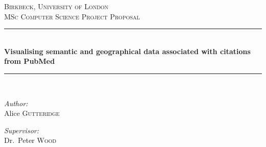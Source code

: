\documentclass[PROP_AGutteridge_CS.tex]{subfiles}
\begin{document}
\newcommand{\HRule}{\rule{\linewidth}{0.5mm}}
\begin{center}

\thispagestyle{empty}

\textsc{\LARGE Birkbeck, University of London}\\[1.5cm]

\textsc{\Large MSc Computer Science Project Proposal}\\[0.5cm]

\HRule \\[0.4cm]
{ \huge \bfseries Visualising semantic and geographical data associated with citations from PubMed\\[0.4cm] }

\HRule \\[1.5cm]

\noindent
\begin{minipage}[t]{0.4\textwidth}
\begin{flushleft} \large
\emph{Author:}\\
Alice \textsc{Gutteridge}
\end{flushleft}
\end{minipage}%
\begin{minipage}[t]{0.4\textwidth}
\begin{flushright} \large
\emph{Supervisor:} \\
Dr.~Peter \textsc{Wood}
\end{flushright}
\end{minipage}

\vfill

\end{center}
\end{document}
